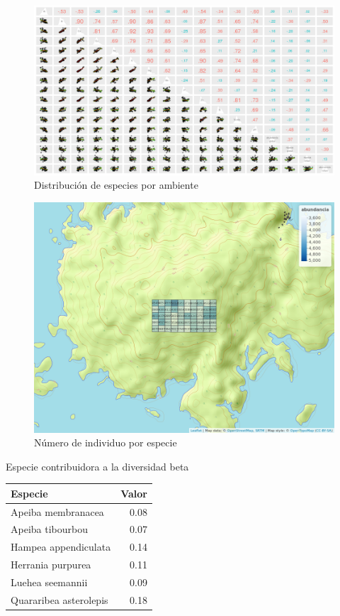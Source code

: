 \documentclass[11pt,]{article}
\begin{document}
\begin{figure}
\centering
\includegraphics[width=1.10000\textwidth]{matriz_correlacion_suelo_abun_riq_spearman.png}
\caption{Distribución de especies por ambiente\label{ambiente}}
\end{figure}

\begin{figure}
\centering
\includegraphics[width=1.10000\textwidth]{mapa_cuadros_abun_global.png}
\caption{Número de individuo por especie\label{riquezas}}
\end{figure}

Especie contribuidora a la diversidad beta\label{tabla}

\begin{longtable}[]{@{}lr@{}}
\toprule
Especie & Valor\tabularnewline
\midrule
\endhead
Apeiba membranacea & 0.08\tabularnewline
Apeiba tibourbou & 0.07\tabularnewline
Hampea appendiculata & 0.14\tabularnewline
Herrania purpurea & 0.11\tabularnewline
Luehea seemannii & 0.09\tabularnewline
Quararibea asterolepis & 0.18\tabularnewline
\bottomrule
\end{longtable}
\end{document}
